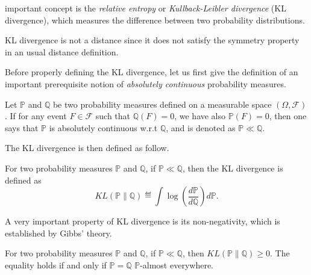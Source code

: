  important concept is the \textit{relative entropy} or \textit{Kullback-Leibler divergence} (KL divergence), which measures the difference between two probability distributions.

\begin{remark}
\begin{leftbar}[remarkbar]
	KL divergence is not a distance since it does not satisfy the symmetry property in an usual distance definition.
\end{leftbar}
\end{remark}

Before properly defining the KL divergence, let us first give the definition of an important prerequisite notion of \textit{absolutely continuous} probability measures.

\begin{definition}\label{def:maths.absolute_continuous}
\begin{leftbar}[defnbar]
	Let $\mathbb{P}$ and $\mathbb{Q}$ be two probability measures defined on a measurable space $(\Omega,\mathcal{F})$. If for any event $F \in \mathcal{F}$ such that $\mathbb{Q}(F) = 0$, we have also $\mathbb{P}(F) = 0$, then one says that $\mathbb{P}$ is absolutely continuous w.r.t $\mathbb{Q}$, and is denoted as $\mathbb{P} \ll \mathbb{Q}$.
\end{leftbar}
\end{definition}

The KL divergence is then defined as follow.

\begin{definition}[KL divergence]\label{def:maths.kl}
\begin{leftbar}[defnbar]
	For two probability measures $\mathbb{P}$ and $\mathbb{Q}$, if $\mathbb{P} \ll \mathbb{Q}$, then the KL divergence is defined as
	\[
		KL(\mathbb{P} \lVert \mathbb{Q}) \eqdef \int \log(\frac{d\mathbb{P}}{d\mathbb{Q}})d\mathbb{P}.
	\]
\end{leftbar}
\end{definition}

A very important property of KL divergence is its non-negativity, which is established by Gibbs' theory.

\begin{theorem}\label{thm:maths.gibbs}
\begin{leftbar}[theorembar]
	For two probability measures $\mathbb{P}$ and $\mathbb{Q}$, if $\mathbb{P} \ll \mathbb{Q}$, then $KL(\mathbb{P} \lVert \mathbb{Q}) \geq 0$. The equality holds if and only if $\mathbb{P} = \mathbb{Q}$ $\mathbb{P}$-almost everywhere.
\end{leftbar}
\end{theorem}

